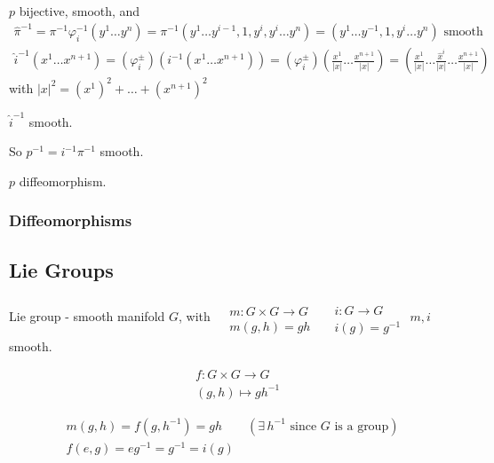 \begin{enumerate}
$p$ bijective, smooth, and 
\[
\begin{gathered}
  \widehat{\pi}^{-1} = \pi^{-1}\varphi_i^{-1}(y^1 \dots y^n) = \pi^{-1}(y^1 \dots y^{i-1}, 1, y^i, y^i \dots y^n ) = (y^1 \dots y^{-1}, 1, y^i \dots y^n) \text{ smooth } \\
 \widehat{i}^{-1}(x^1 \dots x^{n+1}) = (\varphi_i^{\pm})(i^{-1}(x^1 \dots x^{n+1} ) ) = (\varphi_i^{\pm})\left( \frac{x^1}{ |x|} \dots \frac{x^{n+1}}{ |x|} \right) = \left( \frac{x^1}{ |x|} \dots \frac{ \widehat{ x}^i}{ |x|} \dots \frac{x^{n+1}}{ |x|} \right)
\end{gathered}
\]
with $|x|^2 = (x^1)^2 + \dots + (x^{n+1})^2$

$\widehat{i}^{-1}$ smooth.  

So $p^{-1} = i^{-1} \pi^{-1}$ smooth.  

$p$ diffeomorphism.  

\end{enumerate}

\subsubsection*{ Diffeomorphisms }

\subsection*{ Lie Groups }

Lie group - smooth manifold $G$, with $\begin{aligned} & \quad \\ 
  & m : G \times G \to G \\ 
  & m(g,h) = gh \end{aligned}$ \quad \quad $\begin{aligned} & \quad \\
  & i : G \to G \\
  & i(g) = g^{-1} \end{aligned}$ \quad \quad $m,i$ smooth.  

\[
\begin{aligned}
  & f:G\times G \to G \\ 
  & (g,h) \mapsto gh^{-1}
\end{aligned}
\]

\[
\begin{gathered}
  m(g,h) = f(g,h^{-1}) = gh \quad \quad (\exists \, h^{-1} \text{ since } G \text{ is a group}) \\
  f(e,g) = eg^{-1} = g^{-1} = i(g)
\end{gathered}
\]

